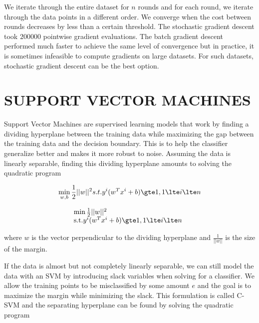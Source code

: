 \documentclass[a4paper,twoside]{article}
\begin{document}
 We iterate through the entire dataset for $n$ rounds and for each round, we iterate through the data points in a different order. We converge when the cost between rounds decreases by less than a certain threshold. The stochastic gradient descent took $200000$ pointwise gradient evaluations. The batch gradient descent performed much faster to achieve the same level of convergence but in practice, it is sometimes infeasible to compute gradients on large datasets. For such datasets, stochastic gradient descent can be the best option.



\section{\uppercase{Support Vector Machines}}

Support Vector Machines are supervised learning models that work by finding a dividing hyperplane between the training data while maximizing the gap between the training data and the decision boundary. This is to help the classifier generalize better and makes it more robust to noise. Assuming the data is linearly separable, finding this dividing hyperplane amounts to solving the quadratic program

\begin{equation}
\min_{w,b} \frac{1}{2} ||w||^2 s.t. y^i(w^T x^i + b) \gte 1, 1 \lte i \lte n
\end{equation}

\begin{equation}
\begin{array}{ll@{}ll}
\min \frac{1}{2} ||w||^2 &\\
\text{s.t.} y^i(w^T x^i + b) \gte 1, 1 \lte i \lte n
\end{array}
\end{equation}

where $w$ is the vector perpendicular to the dividing hyperplane and $\frac{1}{||w||}$ is the size of the margin.

If the data is almost but not completely linearly separable, we can still model the data with an SVM by introducing slack variables when solving for a classifier. We allow the training points to be misclassified by some amount $e$ and the goal is to maximize the margin while minimizing the slack. This formulation is called C-SVM and the separating hyperplane can be found by solving the quadratic program 
\end{document}
